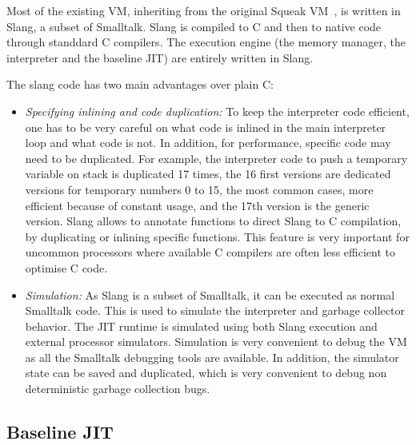 \documentclass[a4paper,12pt,twoside]{../includes/ThesisStyle}
\begin{document}
Most of the existing VM, inheriting from the original Squeak VM~\cite{Inga97a}, is written in Slang, a subset of Smalltalk. Slang is compiled to C and then to native code through standdard C compilers. The execution engine (the memory manager, the interpreter and the baseline JIT) are entirely written in Slang.

The slang code has two main advantages over plain C:
\begin{itemize}
	\item \emph{Specifying inlining and code duplication:} To keep the interpreter code efficient, one has to be very careful on what code is inlined in the main interpreter loop and what code is not. In addition, for performance, specific code may need to be duplicated. For example, the interpreter code to push a temporary variable on stack is duplicated 17 times, the 16 first versions are dedicated versions for temporary numbers 0 to 15, the most common cases, more efficient because of constant usage, and the 17th version is the generic version. Slang allows to annotate functions to direct Slang to C compilation, by duplicating or inlining specific functions. This feature is very important for uncommon processors where available C compilers are often less efficient to optimise C code.
	\item \emph{Simulation:} As Slang is a subset of Smalltalk, it can be executed as normal Smalltalk code. This is used to simulate the interpreter and garbage collector behavior. The JIT runtime is simulated using both Slang execution and external processor simulators. Simulation is very convenient to debug the VM as all the Smalltalk debugging tools are available. In addition, the simulator state can be saved and duplicated, which is very convenient to debug non deterministic garbage collection bugs.
\end{itemize}

\subsection{Baseline JIT}
\end{document}
